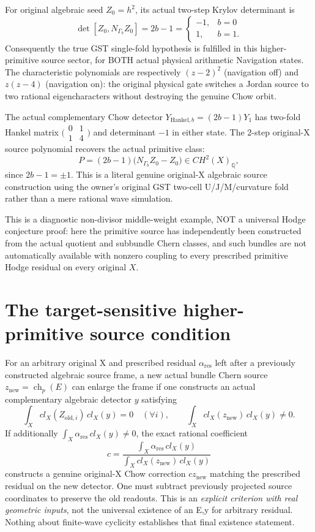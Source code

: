 \documentclass[11pt]{article}
\begin{document}
For original algebraic seed $Z_0=h^2$, its
actual two-step Krylov determinant is
\[
\det[Z_0,N_{\Gamma_b}Z_0]
=2b-1=
\begin{cases}-1,&b=0\\1,&b=1.\end{cases}
\]
Consequently the true GST single-fold hypothesis
is fulfilled in this higher-primitive source sector,
for BOTH actual physical arithmetic Navigation states.
The characteristic polynomials are respectively
$(z-2)^2$ (navigation off) and $z(z-4)$ (navigation on):
the original physical gate switches a Jordan source
to two rational eigencharacters without destroying
the genuine Chow orbit.

The actual complementary Chow detector
$Y_{\mathrm{Hankel},b}=(2b-1)Y_1$
has two-fold Hankel matrix
$\bigl(\begin{smallmatrix}0&1\\1&4\end{smallmatrix}\bigr)$
and determinant $-1$ in either state.
The $2$-step original-X source polynomial
recovers the actual primitive class:
\[
\boxed{
P=(2b-1)\bigl(N_{\Gamma_b} Z_0-Z_0\bigr)
\in CH^2(X)_{\mathbb Q},
}
\]
since $2b-1=\pm1$.
This is a literal genuine original-X algebraic
source construction using the owner's original
GST two-cell U/J/M/curvature fold rather than
a mere rational wave simulation.

This is a diagnostic non-divisor middle-weight
example, NOT a universal Hodge conjecture proof:
here the primitive source has independently
been constructed from the actual quotient
and subbundle Chern classes, and such bundles
are not automatically available with nonzero
coupling to every prescribed primitive Hodge
residual on every original $X$.

\section{The target-sensitive higher-primitive source condition}

For an arbitrary original X and prescribed residual
$\alpha_{\mathrm{res}}$ left after a previously
constructed algebraic source frame, a new actual
bundle Chern source $z_{\mathrm{new}}=\operatorname{ch}_p(E)$
can enlarge the frame if one constructs an actual
complementary algebraic detector $y$ satisfying
\[
\int_X cl_X(Z_{\mathrm{old},i})\,cl_X(y)=0
\quad(\forall i),\qquad
\int_X cl_X(z_{\mathrm{new}})\,cl_X(y)\ne0.
\]
If additionally
$\int_X\alpha_{\mathrm{res}}\,cl_X(y)\ne0$,
the exact rational coefficient
\[
c=\frac{\int_X\alpha_{\mathrm{res}}\,cl_X(y)}
        {\int_X cl_X(z_{\mathrm{new}})\,cl_X(y)}
\]
constructs a genuine original-X Chow correction
$c z_{\mathrm{new}}$ matching the prescribed
residual on the new detector. One must
subtract previously projected source coordinates
to preserve the old readouts.
This is an \emph{explicit criterion with real
geometric inputs}, not the universal existence
of an E,y for arbitrary residual. Nothing
about finite-wave cyclicity establishes
that final existence statement.
\end{document}

